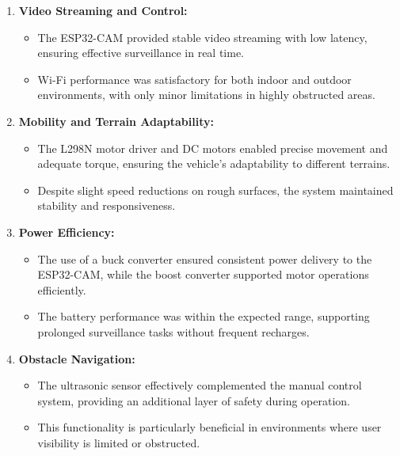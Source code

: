 \documentclass[12pt,a4paper]{report}
\begin{document}
\begin{enumerate}
    \item \textbf{Video Streaming and Control:}
    \begin{itemize}
        \item The ESP32-CAM provided stable video streaming with low latency, ensuring effective surveillance in real time.
        \item Wi-Fi performance was satisfactory for both indoor and outdoor environments, with only minor limitations in highly obstructed areas.
    \end{itemize}
    
    \item \textbf{Mobility and Terrain Adaptability:}
    \begin{itemize}
        \item The L298N motor driver and DC motors enabled precise movement and adequate torque, ensuring the vehicle’s adaptability to different terrains.
        \item Despite slight speed reductions on rough surfaces, the system maintained stability and responsiveness.
    \end{itemize}
    
    \item \textbf{Power Efficiency:}
    \begin{itemize}
        \item The use of a buck converter ensured consistent power delivery to the ESP32-CAM, while the boost converter supported motor operations efficiently.
        \item The battery performance was within the expected range, supporting prolonged surveillance tasks without frequent recharges.
    \end{itemize}
    
    \item \textbf{Obstacle Navigation:}
    \begin{itemize}
        \item The ultrasonic sensor effectively complemented the manual control system, providing an additional layer of safety during operation.
        \item This functionality is particularly beneficial in environments where user visibility is limited or obstructed.
    \end{itemize}
\end{enumerate}




\label{Project Resources and Demonstration Links}
\end{document}
